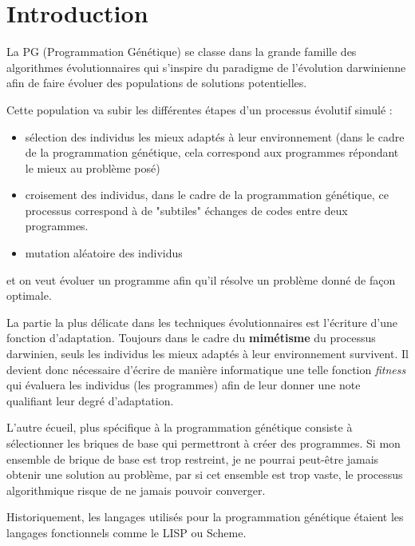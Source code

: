 

\section*{Introduction}

 La PG (Programmation Génétique) se classe dans la grande famille des algorithmes évolutionnaires qui s'inspire du paradigme de l'évolution darwinienne afin de faire évoluer des populations de solutions potentielles.
 
 Cette population va subir les différentes étapes d'un processus évolutif simulé :
 
\begin{itemize}
\item sélection des individus les mieux adaptés à leur environnement (dans le cadre de la programmation génétique, cela correspond aux programmes répondant le mieux au problème posé)
\item croisement des individus, dans le cadre de la programmation génétique, ce processus correspond à de "subtiles" échanges de codes entre deux programmes.
\item mutation aléatoire des individus
\end{itemize}
et on veut évoluer un programme afin qu'il résolve un problème donné de façon optimale.

La partie la plus délicate dans les techniques évolutionnaires est l'écriture d'une fonction d'adaptation. Toujours dans le cadre du \textbf{mimétisme} du processus darwinien, seuls les individus les mieux adaptés à leur environnement survivent. Il devient donc nécessaire d'écrire de manière informatique une telle fonction \textit{fitness} qui évaluera les individus (les programmes) afin de leur donner une note qualifiant leur degré d'adaptation.

L'autre écueil, plus spécifique à la programmation génétique consiste à sélectionner les briques de base qui permettront à créer des programmes. Si mon ensemble de brique de base est trop restreint, je ne pourrai peut-être jamais obtenir une solution au problème, par si cet ensemble est trop vaste, le processus algorithmique risque de ne jamais pouvoir converger.

Historiquement, les langages utilisés pour la programmation génétique étaient les langages fonctionnels comme le LISP ou Scheme.

